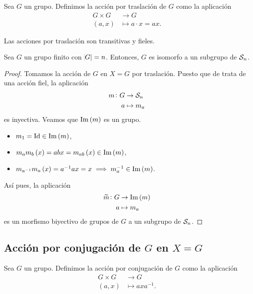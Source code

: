 \begin{defi}
    Sea $G$ un grupo. Definimos la acción por traslación de $G$ como la aplicación
    \[
        \begin{aligned}
            G \times G &\to G \\
            (a, x) &\mapsto a\cdot x = ax.
        \end{aligned}
    \]
\end{defi}

\begin{obs}
    Las acciones por traslación son transitivas y fieles.
\end{obs}

\begin{teo}
    Sea $G$ un grupo finito con $\abs{G} = n$. Entonces, $G$ es isomorfo a un subgrupo de $\mathcal{S}_n$.
\end{teo}

\begin{proof}
    Tomamos la acción de $G$ en $X=G$ por traslación. Puesto que de trata de una acción fiel, la aplicación
    \begin{align*}
        m\colon G&\to\mathcal{S}_n\\
        a&\mapsto m_a
    \end{align*}
    es inyectiva. Veamos que $\operatorname{Im}\left( m\right)$ es un grupo.
    \begin{itemize}
        \item $m_1=\operatorname{Id}\in\operatorname{Im}\left( m\right)$,
        \item $m_am_b\left( x\right) = abx=m_{ab}\left( x\right)\in\operatorname{Im}\left( m\right)$,
        \item $m_{a^{-1}}m_a\left( x\right) = a^{-1}ax=x\implies m_a^{-1}\in\operatorname{Im}\left( m\right)$.
    \end{itemize}
    Así pues, la aplicación
    \begin{align*}
        \widetilde{m}\colon G&\to\operatorname{Im}\left( m\right)\\
        a&\mapsto m_a
    \end{align*}
    es un morfismo biyectivo de grupos de $G$ a un subgrupo de $\mathcal{S}_n$.
\end{proof}

\subsection{Acción por conjugación de $G$ en $X= G$}

\begin{defi}
    Sea $G$ un grupo. Definimos la acción por conjugación de $G$ como la aplicación
    \[
        \begin{aligned}
            G \times G &\to G \\
            (a, x) &\mapsto axa^{-1}.
        \end{aligned}
    \]
\end{defi}

